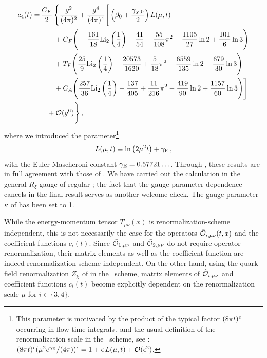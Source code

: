 \begin{equation}
  \begin{split}
    c_4 (t) =& \, \frac{C_F}{2} \, \Bigg\{ \gcoup{2} +
    \gcoup{4} \Bigg[ \left( \beta _0
      + \frac{\gamma_{\chi, 0}}{2} \right) L (\mu, t) \\
      & \qquad + C_F \Bigg( - \frac{161}{18}
      \text{Li}_2\left(\frac{1}{4}\right) - \frac{41}{54} -
      \frac{55}{108} \pi^2 - \frac{1105}{27} \ln 2 +
      \frac{101}{6} \ln 3 \Bigg) \\
      & \qquad + \TF \Bigg( \frac{25}{9}
      \text{Li}_2\left(\frac{1}{4}\right) -
      \frac{20573}{1620} + \frac{5}{18} \pi^2 +
      \frac{6559}{135} \ln 2 - \frac{679}{30} \ln 3 \Bigg)
      \\
      & \qquad + C_A \Bigg( \frac{257}{36}
      \text{Li}_2\left(\frac{1}{4}\right) - \frac{137}{405}
      + \frac{11}{216} \pi^2 - \frac{419}{90} \ln 2 +
      \frac{1157}{60} \ln 3 \Bigg) \Bigg] \\
    & \quad + \order{g^6} \Bigg\} \, ,
    \label{eq:c4}
  \end{split}
\end{equation}
where we introduced the parameter\footnote{This parameter is motivated
  by the product of the typical factor $(8\pi t)^{\epsilon}$ occurring in
  flow-time integrals\,\cite{Luscher:2010iy}, and the usual definition
  of the renormalization scale in the \msbar\ scheme, see
  : $(8\pi t)^\epsilon (\mu^2e^{\gamma_\text{E}}/(4\pi))^\epsilon = 1 +
  \epsilon\,L(\mu,t) + {\cal O}(\epsilon^2)$.}
\begin{equation}
	L (\mu, t) \equiv \ln \left( 2 \mu^2 t \right) + \gamma_\text{E}\,,
        \label{eq:lmut}
\end{equation}
with the Euler-Mascheroni constant $\gamma_\text{E}=0.57721\ldots$. Through
\nlo, these results are in full agreement with those of
. We have carried out the
calculation in the general $R_\xi$ gauge of regular \qcd; the fact that
the gauge-parameter dependence cancels in the final result serves as
another welcome check. The gauge parameter $\kappa$ of  has
been set to 1.

While the energy-momentum tensor $T_{\mu\nu}(x)$ is
renormalization-scheme independent, this is not necessarily the case for
the operators $\tilde{\mathcal{O}}_{i,\mu\nu}(t,x)$ and the coefficient functions
$c_i(t)$. Since $\tilde{\mathcal{O}}_{1,\mu\nu}$ and $\tilde{\mathcal{O}}_{2,\mu\nu}$ do not
require operator renormalization, their matrix elements as well as the
coefficient function are indeed renormalization-scheme independent.  On
the other hand, using the quark-field renormalization $Z_\chi$ of
 in the \msbar\ scheme, matrix elements of
$\tilde{\mathcal{O}}_{i,\mu\nu}$ and coefficient functions $c_i(t)$ become
explicitly dependent on the renormalization scale $\mu$ for
$i\in\{3,4\}$.

